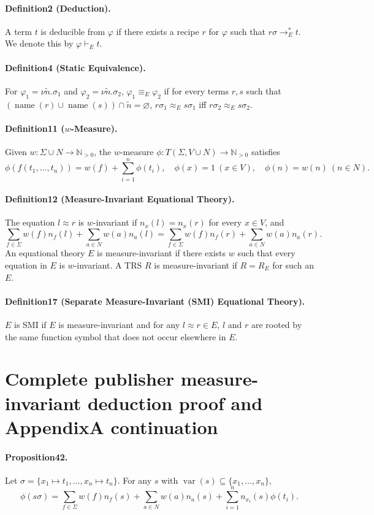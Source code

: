 \documentclass[10pt,a4paper]{amsart}
\begin{document}
\paragraph{Definition2 (Deduction).} A term $t$ is deducible from $\varphi$ if there exists a recipe $r$ for $\varphi$ such that $r\sigma\to_E^*t$. We denote this by $\varphi\vdash_E t$.
\paragraph{Definition4 (Static Equivalence).} For $\varphi_1=\nu\tilde n.\sigma_1$ and $\varphi_2=\nu\tilde n.\sigma_2$, $\varphi_1\equiv_E\varphi_2$ if for every terms $r,s$ such that $(\operatorname{name}(r)\cup\operatorname{name}(s))\cap\tilde n=\varnothing$, $r\sigma_1\approx_Es\sigma_1$ iff $r\sigma_2\approx_Es\sigma_2$.
\paragraph{Definition11 ($w$-Measure).} Given $w:\Sigma\cup N\to\mathbb N_{>0}$, the $w$-measure $\phi:T(\Sigma,V\cup N)\to\mathbb N_{>0}$ satisfies
\[
\phi(f(t_1,\ldots,t_n))=w(f)+\sum_{i=1}^n\phi(t_i),\quad \phi(x)=1\ (x\in V),\quad \phi(n)=w(n)\ (n\in N).
\]
\paragraph{Definition12 (Measure-Invariant Equational Theory).} The equation $l\approx r$ is $w$-invariant if $n_x(l)=n_x(r)$ for every $x\in V$, and
\[
\sum_{f\in\Sigma}w(f)n_f(l)+\sum_{a\in N}w(a)n_a(l)=\sum_{f\in\Sigma}w(f)n_f(r)+\sum_{a\in N}w(a)n_a(r).
\]
An equational theory $E$ is measure-invariant if there exists $w$ such that every equation in $E$ is $w$-invariant. A TRS $R$ is measure-invariant if $R=R_E$ for such an $E$.
\paragraph{Definition17 (Separate Measure-Invariant (SMI) Equational Theory).} $E$ is SMI if $E$ is measure-invariant and for any $l\approx r\in E$, $l$ and $r$ are rooted by the same function symbol that does not occur elsewhere in $E$.

\section*{Complete publisher measure-invariant deduction proof and AppendixA continuation}
\paragraph{Proposition42.} Let $\sigma=\{x_1\mapsto t_1,\ldots,x_n\mapsto t_n\}$. For any $s$ with $\operatorname{var}(s)\subseteq\{x_1,\ldots,x_n\}$,
\[
\phi(s\sigma)=\sum_{f\in\Sigma}w(f)n_f(s)+\sum_{a\in N}w(a)n_a(s)+\sum_{i=1}^nn_{x_i}(s)\phi(t_i).
\]
\end{document}
